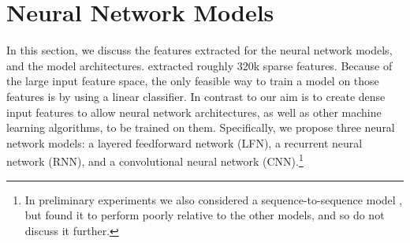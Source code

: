 \documentclass[11pt,a4paper]{article}
\begin{document}








\section{Neural Network Models}



In this section, we discuss the features extracted for the neural
network models, and the model
architectures.  extracted roughly
320k sparse features. Because of the large input feature space, the
only feasible way to train a model on those features is by using a
linear classifier.  In contrast to
 our aim is to create dense input
features to allow neural network architectures, as well as other
machine learning algorithms, to be trained on them. Specifically, we
propose three neural network models: a layered feedforward network
(LFN), a recurrent neural network (RNN), and a convolutional neural
network (CNN).\footnote{In preliminary experiments we also considered
  a sequence-to-sequence model \cite{DBLP:conf/emnlp/ChoMGBBSB14}, but found it to
  perform poorly relative to the other models, and so do not discuss
  it further.}
\end{document}

